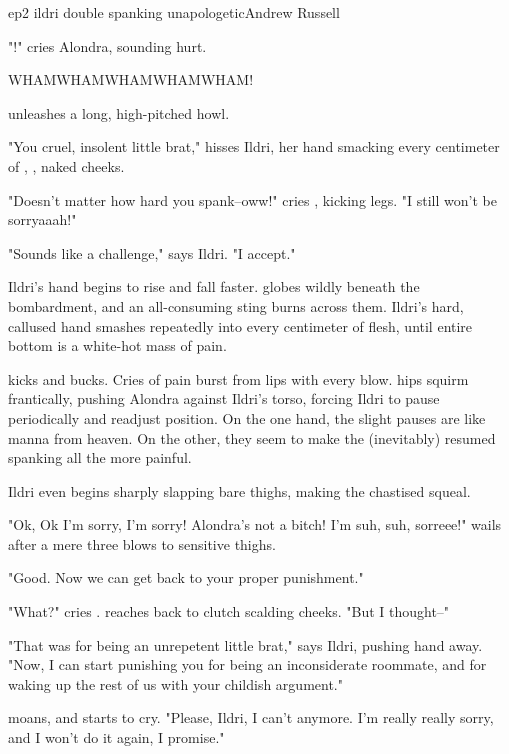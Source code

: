 \documentclass{book}
\begin{document}
\begin{childnode}{ep2 ildri double spanking unapologetic}{Andrew Russell}


   "\name{}!" cries Alondra, sounding hurt.

   WHAMWHAMWHAMWHAMWHAM!

   \name{} unleashes a long, high-pitched howl.

   "You cruel, insolent little brat," hisses Ildri, her hand smacking every centimeter of \names{} \bumadj{}, \quivering{}, naked cheeks.

   "Doesn't matter how hard you spank--oww!" cries \name{}, kicking \hisher{} legs. "I still won't be sorryaaah!"

   "Sounds like a challenge," says Ildri. "I accept."

   Ildri's hand begins to rise and fall faster. \names{} \muscleadj{} globes \quiver{} wildly beneath the bombardment, and an all-consuming sting burns across them. Ildri's hard,
   callused hand smashes repeatedly into every centimeter of \names{} \bumadj{} flesh, until \hisher{} entire bottom is a white-hot mass of pain.

   \name{} kicks and bucks. Cries of pain burst from \hisher{} lips with every blow. \HisHer{} hips squirm frantically, pushing Alondra against Ildri's torso, forcing Ildri to pause periodically and readjust \names{} position. On the one hand, the slight pauses are 
   like manna from heaven. On the other, they seem to make the (inevitably) resumed
   spanking all the more painful.

   Ildri even begins sharply slapping \names{} bare thighs, making the chastised \boygirl{} squeal.
  
   "Ok, Ok I'm sorry, I'm sorry! Alondra's not a bitch! I'm suh, suh, sorreee!" wails \name{} after a mere three blows to \hisher{} sensitive thighs.

    "Good. Now we can get back to your proper punishment."

    "What?" cries \name{}. \HeShe{} reaches back to clutch \hisher{} scalding cheeks. "But I thought--"

    "That was for being an unrepetent little brat," says Ildri, pushing \names{} hand away. "Now, I can start punishing you for being an inconsiderate roommate, and for waking up the rest of us with your
    childish argument."

    \name{} moans, and starts to cry. "Please, Ildri, I can't anymore. I'm really really sorry, and I won't do it again, I promise."


        
\end{childnode}
\end{document}
